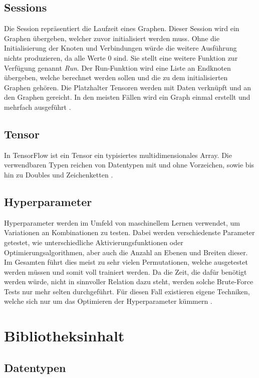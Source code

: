 \subsection{Sessions}

Die Session repräsentiert die Laufzeit eines Graphen. 
Dieser Session wird ein Graphen übergeben, welcher zuvor initialisiert werden muss. 
Ohne die Initialisierung der Knoten und Verbindungen würde die weitere Ausführung nichts produzieren, da alle Werte $0$ sind. 
Sie stellt eine weitere Funktion zur Verfügung genannt \textit{Run}. 
Der Run-Funktion wird eine Liste an Endknoten übergeben, welche berechnet werden sollen und die zu dem initialisierten Graphen gehören. 
Die Platzhalter Tensoren werden mit Daten verknüpft und an den Graphen gereicht. 
In den meisten Fällen wird ein Graph einmal erstellt und mehrfach ausgeführt \cite{wp2015tensorflow}. 

\subsection{Tensor}

In TensorFlow ist ein Tensor ein typisiertes multidimensionales Array. 
Die verwendbaren Typen reichen von Datentypen mit und ohne Vorzeichen, sowie bis hin zu Doubles und Zeichenketten  \cite{wp2015tensorflow}. 

\subsection{Hyperparameter} 

Hyperparameter werden im Umfeld von maschinellem Lernen verwendet, um Variationen an Kombinationen zu testen. 
Dabei werden verschiedenste Parameter getestet, wie unterschiedliche Aktivierungsfunktionen oder Optimierungsalgorithmen, aber auch die Anzahl an Ebenen und Breiten dieser. 
Im Gesamten führt dies meist zu sehr vielen Permutationen, welche ausgetestet werden müssen und somit voll trainiert werden. 
Da die Zeit, die dafür benötigt werden würde, nicht in sinnvoller Relation dazu steht, werden solche Brute-Force Tests nur mehr selten durchgeführt. 
Für diesen Fall existieren eigene Techniken, welche sich nur um das Optimieren der Hyperparameter kümmern \cite{bishop2006pattern}. 

\section{Bibliotheksinhalt}

\subsection{Datentypen}

